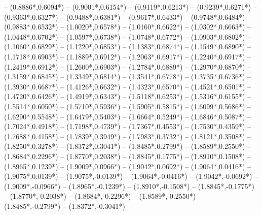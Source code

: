 {	-- ({0.8886*\dx},{0.6094*\dy})
	-- ({0.9001*\dx},{0.6154*\dy})
	-- ({0.9119*\dx},{0.6213*\dy})
	-- ({0.9239*\dx},{0.6271*\dy})
	-- ({0.9363*\dx},{0.6327*\dy})
	-- ({0.9488*\dx},{0.6381*\dy})
	-- ({0.9617*\dx},{0.6433*\dy})
	-- ({0.9748*\dx},{0.6484*\dy})
	-- ({0.9883*\dx},{0.6532*\dy})
	-- ({1.0020*\dx},{0.6578*\dy})
	-- ({1.0160*\dx},{0.6622*\dy})
	-- ({1.0302*\dx},{0.6663*\dy})
	-- ({1.0448*\dx},{0.6702*\dy})
	-- ({1.0597*\dx},{0.6738*\dy})
	-- ({1.0748*\dx},{0.6772*\dy})
	-- ({1.0903*\dx},{0.6802*\dy})
	-- ({1.1060*\dx},{0.6829*\dy})
	-- ({1.1220*\dx},{0.6853*\dy})
	-- ({1.1383*\dx},{0.6874*\dy})
	-- ({1.1549*\dx},{0.6890*\dy})
	-- ({1.1718*\dx},{0.6903*\dy})
	-- ({1.1889*\dx},{0.6912*\dy})
	-- ({1.2063*\dx},{0.6917*\dy})
	-- ({1.2240*\dx},{0.6917*\dy})
	-- ({1.2419*\dx},{0.6912*\dy})
	-- ({1.2600*\dx},{0.6903*\dy})
	-- ({1.2784*\dx},{0.6889*\dy})
	-- ({1.2970*\dx},{0.6870*\dy})
	-- ({1.3159*\dx},{0.6845*\dy})
	-- ({1.3349*\dx},{0.6814*\dy})
	-- ({1.3541*\dx},{0.6778*\dy})
	-- ({1.3735*\dx},{0.6736*\dy})
	-- ({1.3930*\dx},{0.6687*\dy})
	-- ({1.4126*\dx},{0.6632*\dy})
	-- ({1.4323*\dx},{0.6570*\dy})
	-- ({1.4521*\dx},{0.6501*\dy})
	-- ({1.4720*\dx},{0.6426*\dy})
	-- ({1.4919*\dx},{0.6343*\dy})
	-- ({1.5118*\dx},{0.6253*\dy})
	-- ({1.5316*\dx},{0.6155*\dy})
	-- ({1.5514*\dx},{0.6050*\dy})
	-- ({1.5710*\dx},{0.5936*\dy})
	-- ({1.5905*\dx},{0.5815*\dy})
	-- ({1.6099*\dx},{0.5686*\dy})
	-- ({1.6290*\dx},{0.5548*\dy})
	-- ({1.6479*\dx},{0.5403*\dy})
	-- ({1.6664*\dx},{0.5249*\dy})
	-- ({1.6846*\dx},{0.5087*\dy})
	-- ({1.7024*\dx},{0.4918*\dy})
	-- ({1.7198*\dx},{0.4739*\dy})
	-- ({1.7367*\dx},{0.4553*\dy})
	-- ({1.7530*\dx},{0.4359*\dy})
	-- ({1.7688*\dx},{0.4158*\dy})
	-- ({1.7839*\dx},{0.3949*\dy})
	-- ({1.7983*\dx},{0.3732*\dy})
	-- ({1.8121*\dx},{0.3508*\dy})
	-- ({1.8250*\dx},{0.3278*\dy})
	-- ({1.8372*\dx},{0.3041*\dy})
	-- ({1.8485*\dx},{0.2799*\dy})
	-- ({1.8589*\dx},{0.2550*\dy})
	-- ({1.8684*\dx},{0.2296*\dy})
	-- ({1.8770*\dx},{0.2038*\dy})
	-- ({1.8845*\dx},{0.1775*\dy})
	-- ({1.8910*\dx},{0.1508*\dy})
	-- ({1.8965*\dx},{0.1239*\dy})
	-- ({1.9009*\dx},{0.0966*\dy})
	-- ({1.9042*\dx},{0.0692*\dy})
	-- ({1.9064*\dx},{0.0416*\dy})
	-- ({1.9075*\dx},{0.0139*\dy})
	-- ({1.9075*\dx},{-0.0139*\dy})
	-- ({1.9064*\dx},{-0.0416*\dy})
	-- ({1.9042*\dx},{-0.0692*\dy})
	-- ({1.9009*\dx},{-0.0966*\dy})
	-- ({1.8965*\dx},{-0.1239*\dy})
	-- ({1.8910*\dx},{-0.1508*\dy})
	-- ({1.8845*\dx},{-0.1775*\dy})
	-- ({1.8770*\dx},{-0.2038*\dy})
	-- ({1.8684*\dx},{-0.2296*\dy})
	-- ({1.8589*\dx},{-0.2550*\dy})
	-- ({1.8485*\dx},{-0.2799*\dy})
	-- ({1.8372*\dx},{-0.3041*\dy})
}
